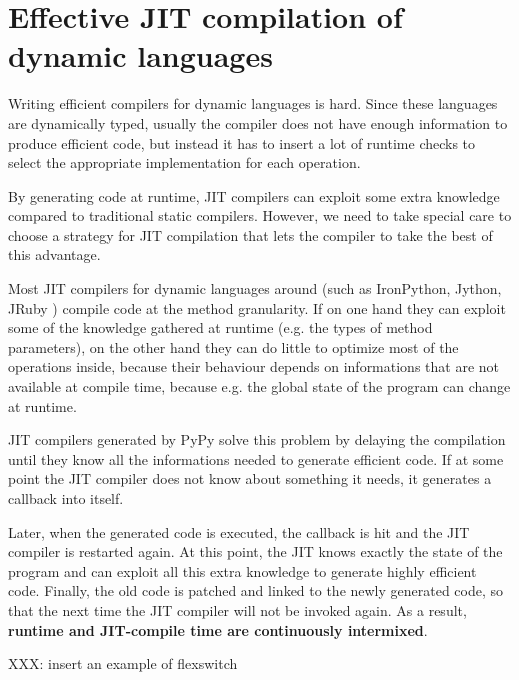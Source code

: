 \section{Effective JIT compilation of dynamic languages}

Writing efficient compilers for dynamic languages is hard.  Since these
languages are dynamically typed, usually the compiler does not have enough
information to produce efficient code, but instead it has to insert a lot of
runtime checks to select the appropriate implementation for each operation.

By generating code at runtime, JIT compilers can exploit some extra knowledge
compared to traditional static compilers.  However, we need to take special
care to choose a strategy for JIT compilation that lets the compiler to take
the best of this advantage.

Most JIT compilers for dynamic languages around (such as IronPython, Jython,
JRuby ) compile code at the method
granularity.  If on one hand they can exploit some of the knowledge gathered
at runtime (e.g. the types of method parameters), on the other hand they can
do little to optimize most of the operations inside, because their behaviour
depends on informations that are not available at compile time, because
e.g. the global state of the program can change at runtime. 

JIT compilers generated by PyPy solve this problem by delaying the compilation
until they know all the informations needed to generate efficient code.  If at
some point the JIT compiler does not know about something it needs, it
generates a callback into itself.  

Later, when the generated code is executed, the callback is hit and the JIT
compiler is restarted again.  At this point, the JIT knows exactly the state
of the program and can exploit all this extra knowledge to generate highly
efficient code.  Finally, the old code is patched and linked to the newly
generated code, so that the next time the JIT compiler will not be invoked
again.  As a result, \textbf{runtime and JIT-compile time are continuously
  intermixed}. 

XXX: insert an example of flexswitch
